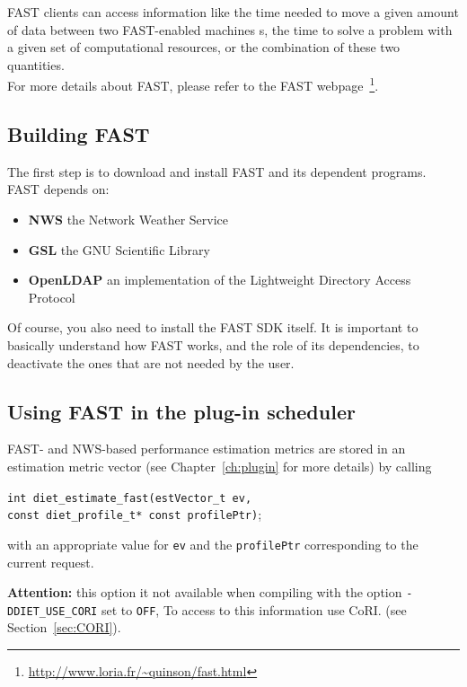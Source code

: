 FAST clients can access information like the time needed to move a given amount
of data between two FAST-enabled machines {\sed}s, the time to solve a problem
with a given set of computational resources, or the combination of these two
quantities.\\

For more details about FAST, please refer to the FAST
webpage~\footnote{\url{http://www.loria.fr/~quinson/fast.html}}.

\subsection{Building FAST}

The first step is to download and install FAST and its dependent programs.
FAST depends on:
\begin{itemize}
\item{\textbf{NWS}} the Network Weather Service
\item{\textbf{GSL}} the GNU Scientific Library
\item{\textbf{OpenLDAP}} an implementation of the Lightweight Directory Access
  Protocol
\end{itemize}
Of course, you also need to install the FAST SDK itself. It is important to
basically understand how FAST works, and the role of its dependencies, to
deactivate the ones that are not needed by the user.

\subsection{Using FAST in the plug-in scheduler}\label{subsection:callFAST}

FAST- and NWS-based performance estimation metrics are stored in an estimation
metric vector (see Chapter~\ref{ch:plugin} for more details) by calling
  \begin{tabbing}
    \texttt{int diet\_estimate\_fast(}\=\texttt{estVector\_t ev,} \\
    \> \texttt{const diet\_profile\_t* const profilePtr)};
  \end{tabbing}
   with an appropriate value for \texttt{ev} and the
   \texttt{profilePtr} corresponding to the current \diet request.

   \textbf{Attention: } this option it not available when compiling  with the
   option \texttt{-DDIET\_USE\_CORI} set to \texttt{OFF},  To access to this
   information use CoRI.  (see Section~\ref{sec:CORI}).

